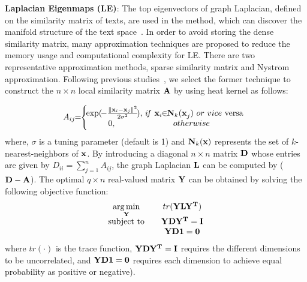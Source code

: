 \documentclass[review]{elsarticle}
\begin{document}
{\bf{Laplacian Eigenmaps (LE)}}: The top eigenvectors of graph Laplacian, defined on the similarity matrix of texts, are used in the method, which can discover the manifold structure of the text space~\cite{37_ng2002spectral}. In order to avoid storing the dense similarity matrix, many approximation techniques are proposed to reduce the memory usage and computational complexity for LE. There are two representative approximation methods, sparse similarity matrix and Nystr\({\ddot{\text{o}}}\)m approximation. Following previous studies~\cite{4_cai2005document,28_zhang2010self}, we select the former technique to construct the \(n \times n\) local similarity matrix \({\bf{A}}\) by using heat kernel as follows:

\begin{equation}
{A_{ij}}\!\! =\!\! \left\{ {\begin{array}{*{20}{c}}
{\!\!\!\!\exp (\! - \frac{{{{\left\| {{{\bf{x}}_i} - {{\bf{x}}_j}} \right\|}^2}}}{{2{\sigma ^2}}}\!),\!\!\!\!}&{i\!f~{\rm{ }}{{\bf{x}}_i}\!\! \in \!\! {{\bf{N}}_k}({\bf{x}}_j^{}){\rm{ }}~or{\rm{ }}~vice~{\rm{ versa}}}\\
{\!\!\!\!0,}&\!\!\!\!{otherwise}
\end{array}} \right.
\label{eq:SimilarityFunction}
\end{equation}
where, \(\sigma \) is a tuning parameter (default is 1) and \({{\bf{N}}_k}({\bf{x}})\) represents the set of \(k\)-nearest-neighbors of \({\bf{x}}\). By introducing a diagonal \(n \times n\) matrix \({\bf{D}}\) whose entries are given by \({D_{ii}} = \sum\nolimits_{j = 1}^n {{A_{ij}}} \), the graph Laplacian \({\bf{L}}\) can be computed by (\({\bf{D}}-{\bf{A}}\)). The optimal \(q \times n\) real-valued matrix \({\bf{ Y}}\) can be obtained by solving the following objective function:
\begin{equation}
\begin{array}{*{20}{c}}
{\mathop {\arg \min }\limits_{{\bf{ Y}}} }&{}&{tr({{{\bf{ Y}}}}{\bf{L Y^T}})}\\
{{\rm{subject~to}}}&{}&{{{{\bf{ Y}}}}{\bf{D Y^T}} = {\bf{I}}}\\
{}&{}&{{{{\bf{ Y}}}}{\bf{D1}} = {\bf{0}}}
\end{array}
\end{equation}
where \(tr( \cdot )\) is the trace function, \({{\bf{ Y}}}{\bf{D Y^T}} = {\bf{I}}\) requires the different dimensions to be uncorrelated, and \({{\bf{ Y}}}{\bf{D1}} = {\bf{0}}\) requires each dimension to achieve equal probability as positive or negative).
\end{document}
